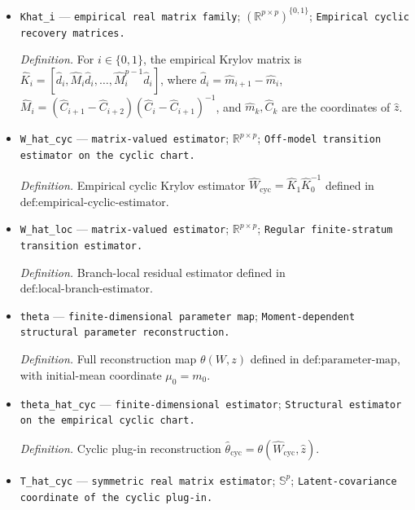 \documentclass{article}
\begin{document}
\begin{itemize}
  \item \texttt{Khat\_\allowbreak{}i} --- \texttt{empirical real matrix family}; \((\mathbb R^{p\times p})^{\{0,1\}}\); \texttt{Empirical cyclic recovery matrices.}
  \par\smallskip\noindent\emph{Definition.} For \(i\in\{0,1\}\), the empirical Krylov matrix is \(\widehat K_i=[\widehat d_i,\widehat M_i\widehat d_i,\ldots,\widehat M_i^{p-1}\widehat d_i]\), where \(\widehat d_i=\widehat m_{i+1}-\widehat m_i\), \(\widehat M_i=(\widehat C_{i+1}-\widehat C_{i+2})(\widehat C_i-\widehat C_{i+1})^{-1}\), and \(\widehat m_k,\widehat C_k\) are the coordinates of \(\widehat z\).
  \item \texttt{W\_\allowbreak{}hat\_\allowbreak{}cyc} --- \texttt{matrix-\allowbreak{}valued estimator}; \(\mathbb R^{p\times p}\); \texttt{Off-\allowbreak{}model transition estimator on the cyclic chart.}
  \par\smallskip\noindent\emph{Definition.} Empirical cyclic Krylov estimator \(\widehat W_{\mathrm{cyc}}=\widehat K_1\widehat K_0^{-1}\) defined in \(\text{def:empirical-cyclic-estimator}\).
  \item \texttt{W\_\allowbreak{}hat\_\allowbreak{}loc} --- \texttt{matrix-\allowbreak{}valued estimator}; \(\mathbb R^{p\times p}\); \texttt{Regular finite-\allowbreak{}stratum transition estimator.}
  \par\smallskip\noindent\emph{Definition.} Branch-local residual estimator defined in \(\text{def:local-branch-estimator}\).
  \item \texttt{theta} --- \texttt{finite-\allowbreak{}dimensional parameter map}; \texttt{Moment-\allowbreak{}dependent structural parameter reconstruction.}
  \par\smallskip\noindent\emph{Definition.} Full reconstruction map \(\theta(W,z)\) defined in \(\text{def:parameter-map}\), with initial-mean coordinate \(\mu_0=m_0\).
  \item \texttt{theta\_\allowbreak{}hat\_\allowbreak{}cyc} --- \texttt{finite-\allowbreak{}dimensional estimator}; \texttt{Structural estimator on the empirical cyclic chart.}
  \par\smallskip\noindent\emph{Definition.} Cyclic plug-in reconstruction \(\widehat\theta_{\mathrm{cyc}}=\theta(\widehat W_{\mathrm{cyc}},\widehat z)\).
  \item \texttt{T\_\allowbreak{}hat\_\allowbreak{}cyc} --- \texttt{symmetric real matrix estimator}; \(\mathbb S^p\); \texttt{Latent-\allowbreak{}covariance coordinate of the cyclic plug-\allowbreak{}in.}

\end{itemize}
\end{document}
